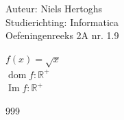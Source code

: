 \documentclass[a4paper]{article}
\begin{document}
  
\noindent \large Auteur: Niels Hertoghs \\
\noindent \large Studierichting: Informatica\\
\noindent \large Oefeningenreeks 2A nr. 1.9\\

\medskip

\normalsize

$f(x) = \sqrt{x}$\\

$\operatorname{dom}f: \mathbb{R}^{+}$\\

$\operatorname{Im}f: \mathbb{R}^{+}$\\

\begin{thebibliography}{999}
\end{thebibliography}
\end{document}
